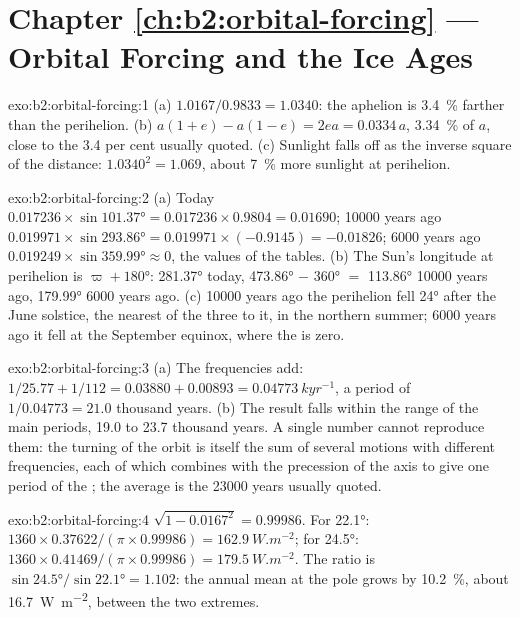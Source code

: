\section*{Chapter \ref{ch:b2:orbital-forcing} --- Orbital Forcing and the Ice Ages}

\begin{solution}{exo:b2:orbital-forcing:1}
(a) $1.0167/0.9833 = 1.0340$: the aphelion is \qty{3.4}{\percent} farther than the perihelion.
(b) $a(1 + e) - a(1 - e) = 2ea = 0.0334\,a$, \qty{3.34}{\percent} of $a$, close to the 3.4 per cent
usually quoted. (c) Sunlight falls off as the inverse square of the distance: $1.0340^2 = 1.069$,
about \qty{7}{\percent} more sunlight at perihelion.
\end{solution}

\begin{solution}{exo:b2:orbital-forcing:2}
(a) Today $0.017236 \times \sin\ang{101.37} = 0.017236 \times 0.9804 = 0.01690$; \num{10000} years ago
$0.019971 \times \sin\ang{293.86} = 0.019971 \times (-0.9145) = -0.01826$; \num{6000} years ago
$0.019249 \times \sin\ang{359.99} \approx 0$, the values of the tables. (b) The Sun's longitude at
perihelion is $\varpi + \ang{180}$: \ang{281.37} today, \ang{473.86} $-$ \ang{360} $=$ \ang{113.86}
\num{10000} years ago, \ang{179.99} \num{6000} years ago. (c) \num{10000} years ago the perihelion
fell \ang{24} after the June solstice, the nearest of the three to it, in the northern summer;
\num{6000} years ago it fell at the September equinox, where the  is zero.
\end{solution}

\begin{solution}{exo:b2:orbital-forcing:3}
(a) The frequencies add: $1/25.77 + 1/112 = 0.03880 + 0.00893 = \qty{0.04773}{kyr^{-1}}$, a period
of $1/0.04773 = 21.0$ thousand years. (b) The result falls within the range of the main periods,
19.0 to 23.7 thousand years. A single number cannot reproduce them: the turning of the orbit
is itself the sum of several motions with different frequencies, each of which combines with the
precession of the axis to give one period of the ; the average is the
\num{23000} years usually quoted.
\end{solution}

\begin{solution}{exo:b2:orbital-forcing:4}
$\sqrt{1 - 0.0167^2} = 0.99986$. For \ang{22.1}: $1360 \times 0.37622/(\pi \times 0.99986) =
\qty{162.9}{W.m^{-2}}$; for \ang{24.5}: $1360 \times 0.41469/(\pi \times 0.99986) =
\qty{179.5}{W.m^{-2}}$. The ratio is $\sin\ang{24.5}/\sin\ang{22.1} = 1.102$: the annual mean at the
pole grows by \qty{10.2}{\percent}, about \qty{16.7}{W.m^{-2}}, between the two extremes.
\end{solution}

